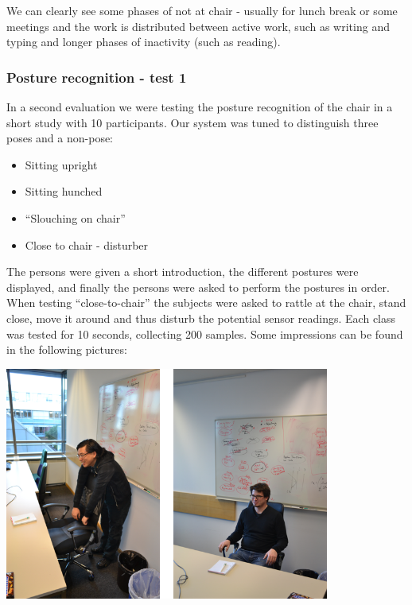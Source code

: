 We can clearly see some phases of not at chair - usually for lunch break or some meetings and the work is distributed between active work, such as writing and typing and longer phases of inactivity (such as reading).

\subsubsection*{Posture recognition - test 1}
In a second evaluation we were testing the posture recognition of the chair in a short study with 10 participants. Our system was tuned to distinguish three poses and a non-pose:
\begin{itemize}
\item Sitting upright
\item Sitting hunched
\item “Slouching on chair”
\item Close to chair - disturber
\end{itemize}

The persons were given a short introduction, the different postures were displayed, and finally the persons were asked to perform the postures in order. When testing “close-to-chair” the subjects were asked to rattle at the chair, stand close, move it around and thus disturb the potential sensor readings. Each class was tested for 10 seconds, collecting 200 samples. Some impressions can be found in the following pictures:

\begin{minipage}{\linewidth}
\centering
\includegraphics[width=0.8\textwidth]{images/prot_capchair_eval_pos1}
\label{fig:prot_capchair_eval_pos1}
\end{minipage}	 

